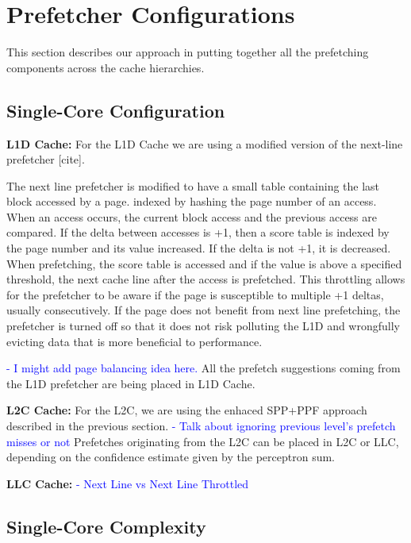\section{Prefetcher Configurations}
\label{Config}

This section describes our approach in putting together all the prefetching 
components across the cache hierarchies.

\subsection{Single-Core Configuration}
\label{Config-Single}

\noindent \textbf{L1D Cache:}
For the L1D Cache we are using a modified version of the next-line prefetcher [cite].

The next line prefetcher is modified to have a small table containing the last 
block accessed by a page. indexed by hashing the page number of an access.
When an access occurs, the current block access and the previous access are compared.
If the delta between accesses is +1, then a score table is indexed by the page number and
its value increased. If the delta is not +1, it is decreased. When prefetching, the score table is 
accessed and if the value is above a specified threshold, the next cache line after the access is 
prefetched. This throttling allows for the prefetcher to be aware if the page is susceptible
to multiple +1 deltas, usually consecutively. If the page does not benefit from next line prefetching,
the prefetcher is turned off so that it does not risk polluting the L1D and wrongfully evicting
data that is more beneficial to performance.

\textcolor{blue}{
- I might add page balancing idea here.
}
All the prefetch suggestions coming from the L1D prefetcher are being placed in L1D Cache.

\noindent \textbf{L2C Cache:}
For the L2C, we are using the enhaced SPP+PPF approach described in the previous section.
\textcolor{blue}{
- Talk about ignoring previous level's prefetch misses or not
}
Prefetches originating from the L2C can be placed in L2C or LLC, depending on the confidence
estimate given by the perceptron sum.

\noindent \textbf{LLC Cache:}
\textcolor{blue}{
- Next Line vs Next Line Throttled
}

\subsection{Single-Core Complexity}
\label{Config-Complex}

